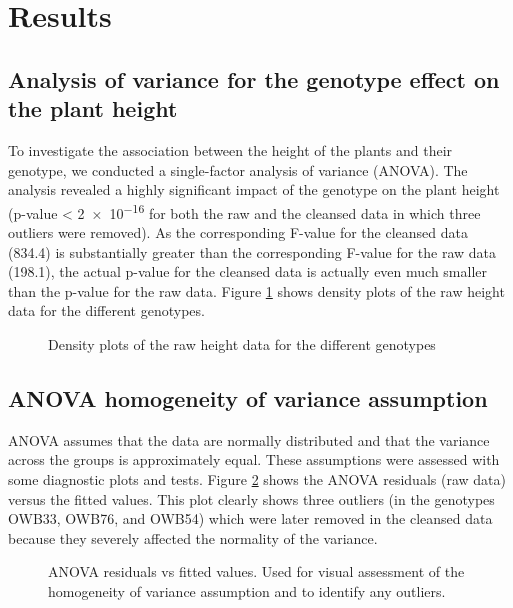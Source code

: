 \section{Results}

\subsection{Analysis of variance for the genotype effect on the plant height}

To investigate the association between the height of the plants and their genotype, we conducted a single-factor analysis of variance (ANOVA). The analysis revealed a highly significant impact of the genotype on the plant height (p-value < \num{2e-16} for both the raw and the cleansed data in which three outliers were removed). As the corresponding F-value for the cleansed data (\num{834.4}) is substantially greater than the corresponding F-value for the raw data (\num{198.1}), the actual p-value for the cleansed data is actually even much smaller than the p-value for the raw data. Figure \ref{fig:raw_genotype_height} shows density plots of the raw height data for the different genotypes.

\begin{figure}[htbp]
    
    \caption{Density plots of the raw height data for the different genotypes}
    \label{fig:raw_genotype_height}
\end{figure}

\subsection{ANOVA homogeneity of variance assumption}

ANOVA assumes that the data are normally distributed and that the variance across the groups is approximately equal. These assumptions were assessed with some diagnostic plots and tests. Figure \ref{fig:raw_aov_height_residuals_vs_fit} shows the ANOVA residuals (raw data) versus the fitted values. This plot clearly shows three outliers (in the genotypes OWB33, OWB76, and OWB54) which were later removed in the cleansed data because they severely affected the normality of the variance.

\begin{figure}[htbp]
    
    \caption{ANOVA residuals vs fitted values. Used for visual assessment of the homogeneity of variance assumption and to identify any outliers.}
    \label{fig:raw_aov_height_residuals_vs_fit}
\end{figure}

